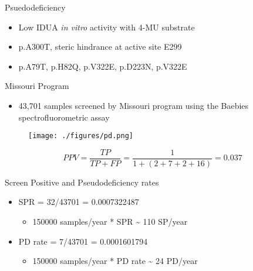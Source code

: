 \documentclass[presentation, smaller]{beamer}
\begin{document}
\begin{frame}[label={sec:orgheadline13}]{Psuedodeficiency}
\begin{itemize}
\item Low IDUA \emph{in vitro} activity with 4-MU substrate
\item p.A300T, steric hindrance at active site E299
\item p.A79T, p.H82Q, p.V322E, p.D223N, p.V322E
\end{itemize}
\end{frame}


\begin{frame}[label={sec:orgheadline14}]{Missouri Program}
\begin{itemize}
\item 43,701 samples screened by Missouri program using the Baebies spectrofluorometric assay
\end{itemize}

\begin{figure}[htb]
\centering
\texttt{[image: ./figures/pd.png]}
\label{fig:pd}
\end{figure}


\[
 PPV = \frac{TP}{TP + FP}  = \frac{1}{1 + (2 + 7 + 2 + 16)} = 0.037
\]

\begin{block}{Screen Positive and Pseudodeficiency rates}
\begin{itemize}
\item SPR = 32/43701 =  0.0007322487
\begin{itemize}
\item 150000 samples/year * SPR \textasciitilde{}  110 SP/year
\end{itemize}
\item PD rate = 7/43701 = 0.0001601794
\begin{itemize}
\item 150000 samples/year * PD rate \textasciitilde{} 24 PD/year
\end{itemize}
\end{itemize}
\end{block}
\end{frame}
\end{document}
